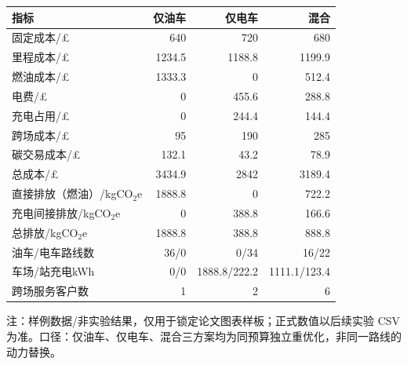 \begin{tabular}{@{}lrrr@{}}
\toprule
指标 & 仅油车 & 仅电车 & 混合\\
\midrule
固定成本/£ & 640 & 720 & 680\\
里程成本/£ & 1234.5 & 1188.8 & 1199.9\\
燃油成本/£ & 1333.3 & 0 & 512.4\\
电费/£ & 0 & 455.6 & 288.8\\
充电占用/£ & 0 & 244.4 & 144.4\\
跨场成本/£ & 95 & 190 & 285\\
碳交易成本/£ & 132.1 & 43.2 & 78.9\\
总成本/£ & 3434.9 & 2842 & 3189.4\\
直接排放（燃油）/kgCO$_2$e & 1888.8 & 0 & 722.2\\
充电间接排放/kgCO$_2$e & 0 & 388.8 & 166.6\\
总排放/kgCO$_2$e & 1888.8 & 388.8 & 888.8\\
油车/电车路线数 & 36/0 & 0/34 & 16/22\\
车场/站充电kWh & 0/0 & 1888.8/222.2 & 1111.1/123.4\\
跨场服务客户数 & 1 & 2 & 6\\
\bottomrule
\end{tabular}
\par\footnotesize 注：样例数据/非实验结果，仅用于锁定论文图表样板；正式数值以后续实验 CSV 为准。口径：仅油车、仅电车、混合三方案均为同预算独立重优化，非同一路线的动力替换。
